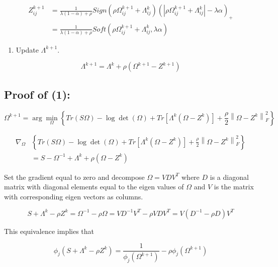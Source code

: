 \documentclass[12pt,]{book}
\providecommand{\tightlist}{%
  \setlength{\itemsep}{0pt}\setlength{\parskip}{0pt}}
\theoremstyle{definition}
\theoremstyle{definition}
\theoremstyle{definition}
\theoremstyle{remark}
\begin{document}
\begin{align*}
Z_{ij}^{k + 1} &= \frac{1}{\lambda(1 - \alpha) + \rho}Sign\left(\rho\Omega_{ij}^{k + 1} + \Lambda_{ij}^{k}\right)\left( \left| \rho\Omega_{ij}^{k + 1} + \Lambda_{ij}^{k} \right| - \lambda\alpha \right)_{+} \\
&= \frac{1}{\lambda(1 - \alpha) + \rho}Soft\left(\rho\Omega_{ij}^{k + 1} + \Lambda_{ij}^{k}, \lambda\alpha\right)
\end{align*}

\begin{enumerate}
\def\labelenumi{\arabic{enumi}.}
\setcounter{enumi}{2}
\tightlist
\item
  Update \(\Lambda^{k + 1}\).
\end{enumerate}

\[ \Lambda^{k + 1} = \Lambda^{k} + \rho\left( \Omega^{k + 1} - Z^{k + 1} \right) \]

\vspace{1cm}

\hypertarget{proof-of-1}{%
\subsection{Proof of (1):}\label{proof-of-1}}

\[ \Omega^{k + 1} = \arg\min_{\Omega}\left\{ Tr\left(S\Omega\right) - \log\det\left(\Omega\right) + Tr\left[\Lambda^{k}\left(\Omega - Z^{k}\right)\right] + \frac{\rho}{2}\left\| \Omega - Z^{k} \right\|_{F}^{2} \right\} \]

\begin{align*}
  \nabla_{\Omega}&\left\{ Tr\left(S\Omega\right) - \log\det\left(\Omega\right) + Tr\left[\Lambda^{k}\left(\Omega - Z^{k}\right)\right] + \frac{\rho}{2}\left\| \Omega - Z^{k} \right\|_{F}^{2} \right\} \\
  &= S - \Omega^{-1} + \Lambda^{k} + \rho\left( \Omega - Z^{k} \right)
\end{align*}

Set the gradient equal to zero and decompose \(\Omega = VDV^{T}\) where
\(D\) is a diagonal matrix with diagonal elements equal to the eigen
values of \(\Omega\) and \(V\) is the matrix with corresponding eigen
vectors as columns.

\[ S + \Lambda^{k} - \rho Z^{k} = \Omega^{-1} - \rho \Omega = VD^{-1}V^{T} - \rho VDV^{T} =  V\left(D^{-1} - \rho D\right)V^{T} \]

This equivalence implies that

\[ \phi_{j}\left( S + \Lambda^{k} - \rho Z^{k} \right) = \frac{1}{\phi_{j}(\Omega^{k + 1})} - \rho\phi_{j}(\Omega^{k + 1}) \]
\end{document}
